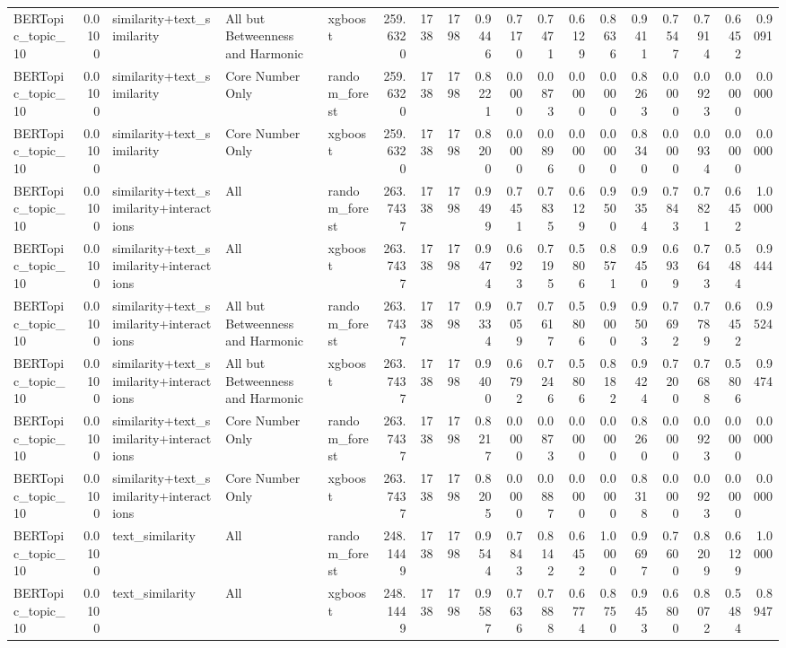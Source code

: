 \begin{tabular}{lrlllrrrrrrrrrrrrr}
BERTopic_topic_10 & 0.0100 & similarity+text_similarity & All but Betweenness and Harmonic & xgboost & 259.6320 & 1738 & 1798 & 0.9446 & 0.7170 & 0.7471 & 0.6129 & 0.8636 & 0.9411 & 0.7547 & 0.7914 & 0.6452 & 0.9091 \\
BERTopic_topic_10 & 0.0100 & similarity+text_similarity & Core Number Only & random_forest & 259.6320 & 1738 & 1798 & 0.8221 & 0.0000 & 0.0873 & 0.0000 & 0.0000 & 0.8263 & 0.0000 & 0.0923 & 0.0000 & 0.0000 \\
BERTopic_topic_10 & 0.0100 & similarity+text_similarity & Core Number Only & xgboost & 259.6320 & 1738 & 1798 & 0.8200 & 0.0000 & 0.0896 & 0.0000 & 0.0000 & 0.8340 & 0.0000 & 0.0934 & 0.0000 & 0.0000 \\
BERTopic_topic_10 & 0.0100 & similarity+text_similarity+interactions & All & random_forest & 263.7437 & 1738 & 1798 & 0.9499 & 0.7451 & 0.7835 & 0.6129 & 0.9500 & 0.9354 & 0.7843 & 0.7821 & 0.6452 & 1.0000 \\
BERTopic_topic_10 & 0.0100 & similarity+text_similarity+interactions & All & xgboost & 263.7437 & 1738 & 1798 & 0.9474 & 0.6923 & 0.7195 & 0.5806 & 0.8571 & 0.9450 & 0.6939 & 0.7643 & 0.5484 & 0.9444 \\
BERTopic_topic_10 & 0.0100 & similarity+text_similarity+interactions & All but Betweenness and Harmonic & random_forest & 263.7437 & 1738 & 1798 & 0.9334 & 0.7059 & 0.7617 & 0.5806 & 0.9000 & 0.9503 & 0.7692 & 0.7789 & 0.6452 & 0.9524 \\
BERTopic_topic_10 & 0.0100 & similarity+text_similarity+interactions & All but Betweenness and Harmonic & xgboost & 263.7437 & 1738 & 1798 & 0.9400 & 0.6792 & 0.7246 & 0.5806 & 0.8182 & 0.9424 & 0.7200 & 0.7688 & 0.5806 & 0.9474 \\
BERTopic_topic_10 & 0.0100 & similarity+text_similarity+interactions & Core Number Only & random_forest & 263.7437 & 1738 & 1798 & 0.8217 & 0.0000 & 0.0873 & 0.0000 & 0.0000 & 0.8260 & 0.0000 & 0.0923 & 0.0000 & 0.0000 \\
BERTopic_topic_10 & 0.0100 & similarity+text_similarity+interactions & Core Number Only & xgboost & 263.7437 & 1738 & 1798 & 0.8205 & 0.0000 & 0.0887 & 0.0000 & 0.0000 & 0.8318 & 0.0000 & 0.0923 & 0.0000 & 0.0000 \\
BERTopic_topic_10 & 0.0100 & text_similarity & All & random_forest & 248.1449 & 1738 & 1798 & 0.9544 & 0.7843 & 0.8142 & 0.6452 & 1.0000 & 0.9697 & 0.7600 & 0.8209 & 0.6129 & 1.0000 \\
BERTopic_topic_10 & 0.0100 & text_similarity & All & xgboost & 248.1449 & 1738 & 1798 & 0.9587 & 0.7636 & 0.7888 & 0.6774 & 0.8750 & 0.9453 & 0.6800 & 0.8072 & 0.5484 & 0.8947 \\

\end{tabular}
